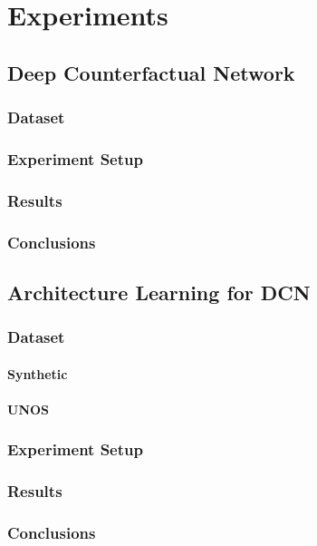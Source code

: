 %

\chapter{\label{ch:5-experiments}Experiments} 


\section{Deep Counterfactual Network}
\subsection{Dataset}

\subsection{Experiment Setup}

\subsection{Results}

\subsection{Conclusions}

\section{Architecture Learning for DCN}
\subsection{Dataset}
\subsubsection{Synthetic}
\subsubsection{UNOS}

\subsection{Experiment Setup}

\subsection{Results}

\subsection{Conclusions}